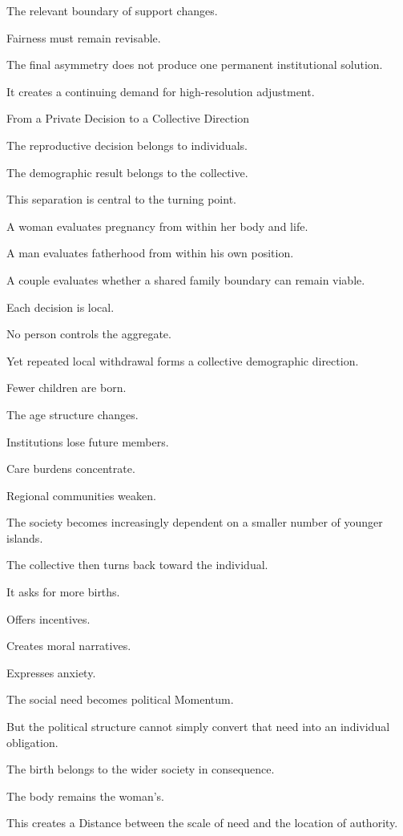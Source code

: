 The relevant boundary of support changes.

Fairness must remain revisable.

The final asymmetry does not produce one permanent institutional solution.

It creates a continuing demand for high-resolution adjustment.

From a Private Decision to a Collective Direction

The reproductive decision belongs to individuals.

The demographic result belongs to the collective.

This separation is central to the turning point.

A woman evaluates pregnancy from within her body and life.

A man evaluates fatherhood from within his own position.

A couple evaluates whether a shared family boundary can remain viable.

Each decision is local.

No person controls the aggregate.

Yet repeated local withdrawal forms a collective demographic direction.

Fewer children are born.

The age structure changes.

Institutions lose future members.

Care burdens concentrate.

Regional communities weaken.

The society becomes increasingly dependent on a smaller number of younger islands.

The collective then turns back toward the individual.

It asks for more births.

Offers incentives.

Creates moral narratives.

Expresses anxiety.

The social need becomes political Momentum.

But the political structure cannot simply convert that need into an individual obligation.

The birth belongs to the wider society in consequence.

The body remains the woman’s.

This creates a Distance between the scale of need and the location of authority.

